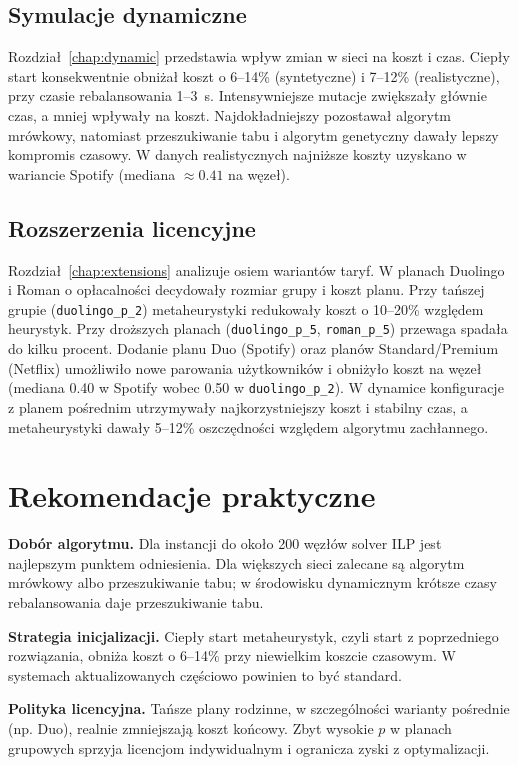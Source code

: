 \subsection{Symulacje dynamiczne}
Rozdział~\ref{chap:dynamic} przedstawia wpływ zmian w sieci na koszt i czas. Ciepły start konsekwentnie obniżał koszt o 6--14\% (syntetyczne) i 7--12\% (realistyczne), przy czasie rebalansowania 1--3~s. Intensywniejsze mutacje zwiększały głównie czas, a mniej wpływały na koszt. Najdokładniejszy pozostawał algorytm mrówkowy, natomiast przeszukiwanie tabu i algorytm genetyczny dawały lepszy kompromis czasowy. W danych realistycznych najniższe koszty uzyskano w wariancie Spotify (mediana $\approx 0.41$ na węzeł).

\subsection{Rozszerzenia licencyjne}
Rozdział~\ref{chap:extensions} analizuje osiem wariantów taryf. W planach Duolingo i Roman o opłacalności decydowały rozmiar grupy i koszt planu. Przy tańszej grupie (\texttt{duolingo\_p\_2}) metaheurystyki redukowały koszt o 10--20\% względem heurystyk. Przy droższych planach (\texttt{duolingo\_p\_5}, \texttt{roman\_p\_5}) przewaga spadała do kilku procent. Dodanie planu Duo (Spotify) oraz planów Standard/Premium (Netflix) umożliwiło nowe parowania użytkowników i obniżyło koszt na węzeł (mediana 0.40 w Spotify wobec 0.50 w \texttt{duolingo\_p\_2}). W dynamice konfiguracje z planem pośrednim utrzymywały najkorzystniejszy koszt i stabilny czas, a metaheurystyki dawały 5--12\% oszczędności względem algorytmu zachłannego.

\section{Rekomendacje praktyczne}

\textbf{Dobór algorytmu.} Dla instancji do około 200 węzłów solver ILP jest najlepszym punktem odniesienia. Dla większych sieci zalecane są algorytm mrówkowy albo przeszukiwanie tabu; w środowisku dynamicznym krótsze czasy rebalansowania daje przeszukiwanie tabu.

\textbf{Strategia inicjalizacji.} Ciepły start metaheurystyk, czyli start z poprzedniego rozwiązania, obniża koszt o 6--14\% przy niewielkim koszcie czasowym. W systemach aktualizowanych częściowo powinien to być standard.

\textbf{Polityka licencyjna.} Tańsze plany rodzinne, w szczególności warianty pośrednie (np. Duo), realnie zmniejszają koszt końcowy. Zbyt wysokie $p$ w planach grupowych sprzyja licencjom indywidualnym i ogranicza zyski z optymalizacji.

